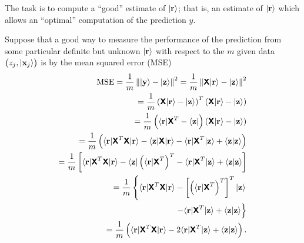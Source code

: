 {\begin{enumerate}
The task is to compute a ``good'' estimate of $\vert {\bf r} \rangle$;
that is, an estimate of $\vert {\bf r} \rangle$
which allows an ``optimal'' computation of the prediction $y$.

Suppose that a good way to measure the performance
of the prediction from some particular definite but unknown $\vert {\bf r} \rangle $
with respect to the $m$ given data
$\begin{pmatrix}z_j, \vert {\bf x}_j \rangle \end{pmatrix}$
is by the mean squared error (MSE)
\begin{equation}
\begin{split}
\text{MSE}
=
\frac{1}{m}
\left\|
\vert {\bf y} \rangle - \vert {\bf z} \rangle
\right\|^2
=
\frac{1}{m}
\left\|
\textsf{\textbf{X}} \vert {\bf r} \rangle
 - \vert {\bf z}   \rangle
\right\|^2
\\
=
\frac{1}{m}
\left(
\textsf{\textbf{X}} \vert {\bf r} \rangle
 - \vert {\bf z}   \rangle
\right)^T
\left(
\textsf{\textbf{X}} \vert {\bf r} \rangle
 - \vert {\bf z}   \rangle
\right)
\\
=
\frac{1}{m}
\left(
\langle {\bf r} \vert \textsf{\textbf{X}}^T
- \langle {\bf z} \vert
\right)
\left(
\textsf{\textbf{X}} \vert {\bf r} \rangle
- \vert {\bf z}   \rangle
\right)
\\
=
\frac{1}{m} \left(
\langle {\bf r} \vert \textsf{\textbf{X}}^T \textsf{\textbf{X}} \vert {\bf r} \rangle
- \langle {\bf z} \vert  \textsf{\textbf{X}} \vert {\bf r} \rangle
- \langle {\bf r} \vert \textsf{\textbf{X}}^T   \vert {\bf z}   \rangle
+ \langle {\bf z} \vert    {\bf z}   \rangle
\right)
\\
=
\frac{1}{m} \left[
\langle {\bf r} \vert \textsf{\textbf{X}}^T \textsf{\textbf{X}} \vert {\bf r} \rangle
- \langle {\bf z} \vert \left( \langle  {\bf r} \vert \textsf{\textbf{X}}^T\right)^T
- \langle {\bf r} \vert \textsf{\textbf{X}}^T   \vert {\bf z}   \rangle
+ \langle {\bf z} \vert    {\bf z}   \rangle
\right]
\\
=
\frac{1}{m} \left\{
\langle {\bf r} \vert \textsf{\textbf{X}}^T \textsf{\textbf{X}} \vert {\bf r} \rangle
- \left[  \left( \langle  {\bf r} \vert \textsf{\textbf{X}}^T \right)^T  \right]^T \vert {\bf z} \rangle
\right .\\ \left.
- \langle {\bf r} \vert \textsf{\textbf{X}}^T   \vert {\bf z}   \rangle
+ \langle {\bf z} \vert    {\bf z}   \rangle
\right\}
\\
=
\frac{1}{m} \left(
\langle {\bf r} \vert \textsf{\textbf{X}}^T \textsf{\textbf{X}} \vert {\bf r} \rangle
- 2 \langle {\bf r} \vert \textsf{\textbf{X}}^T   \vert {\bf z}   \rangle
+ \langle {\bf z} \vert    {\bf z}   \rangle
\right)
.
\end{split}
\label{2016-ml-MSE}
\end{equation}


\end{enumerate}}
